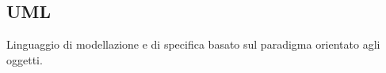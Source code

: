 \documentclass[../glossario.tex]{subfiles}
\begin{document}
\subsection*{UML}
Linguaggio di modellazione e di specifica basato sul paradigma orientato agli oggetti.

    
\end{document}
